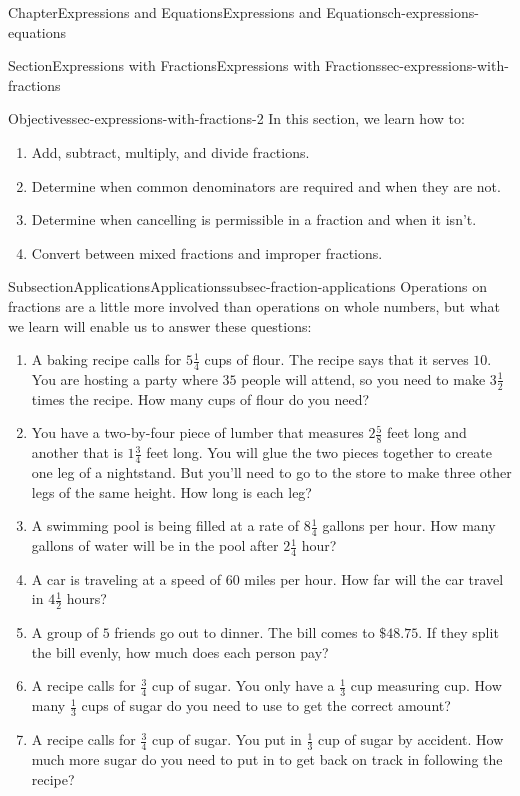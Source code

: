 \documentclass[twoside,11pt,]{book}
\numberwithin{equation}{chapter}
\begin{document}
\begin{chapterptx}{Chapter}{Expressions and Equations}{}{Expressions and Equations}{}{}{ch-expressions-equations}
\begin{sectionptx}{Section}{Expressions with Fractions}{}{Expressions with Fractions}{}{}{sec-expressions-with-fractions}
\begin{objectives}{Objectives}{sec-expressions-with-fractions-2}
In this section, we learn how to:%
%
\begin{enumerate}
\item{}Add, subtract, multiply, and divide fractions.%
\item{}Determine when common denominators are required and when they are not.%
\item{}Determine when cancelling is permissible in a fraction and when it isn't.%
\item{}Convert between mixed fractions and improper fractions.%
\end{enumerate}
\end{objectives}
%
%
\typeout{************************************************}
\typeout{************************************************}
%
\begin{subsectionptx}{Subsection}{Applications}{}{Applications}{}{}{subsec-fraction-applications}
Operations on fractions are a little more involved than operations on whole numbers, but what we learn will enable us to answer these questions:%
\begin{enumerate}
\item{}A baking recipe calls for \(5\frac{1}{4}\) cups of flour. The recipe says that it serves \(10\). You are hosting a party where \(35\) people will attend, so you need to make \(3\frac{1}{2}\) times the recipe. How many cups of flour do you need?%
\item{}You have a two-by-four piece of lumber that measures \(2\frac{5}{8}\) feet long and another that is \(1\frac{3}{4}\) feet long. You will glue the two pieces together to create one leg of a nightstand. But you'll need to go to the store to make three other legs of the same height. How long is each leg?%
\item{}A swimming pool is being filled at a rate of \(8\frac{1}{4}\) gallons per hour. How many gallons of water will be in the pool after \(2\frac{1}{4}\) hour?%
\item{}A car is traveling at a speed of \(60\) miles per hour. How far will the car travel in \(4\frac{1}{2}\) hours?%
\item{}A group of \(5\) friends go out to dinner. The bill comes to \(\$48.75\). If they split the bill evenly, how much does each person pay?%
\item{}A recipe calls for \(\frac{3}{4}\) cup of sugar. You only have a \(\frac{1}{3}\) cup measuring cup. How many \(\frac{1}{3}\) cups of sugar do you need to use to get the correct amount?%
\item{}A recipe calls for \(\frac{3}{4}\) cup of sugar. You put in \(\frac{1}{3}\) cup of sugar by accident. How much more sugar do you need to put in to get back on track in following the recipe?%

\end{enumerate}
\end{subsectionptx}
\end{sectionptx}
\end{chapterptx}
\end{document}
